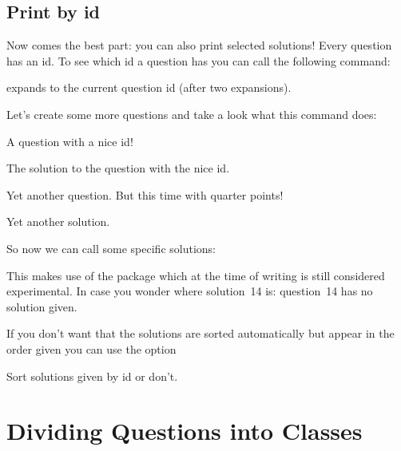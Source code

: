 \documentclass[DIV10,toc=index,toc=bib,numbers=noendperiod]{cnpkgdoc}
\begin{document}
\subsection{Print by \acs{id}}\label{ssec:ids}
Now comes the best part: you can also print selected solutions!  Every
question has an \acs{id}.  To see which \acs{id} a question has you can call
the following command:
\begin{beschreibung}
  \newline{}%
    expands to the current question \acs{id} (after two expansions).
\end{beschreibung}
Let's create some more questions and take a look what this command does:
\begin{beispiel}
 \begin{question}[ID=nice!]
  A question with a nice \acs{id}!
 \end{question}
 \begin{solution}
  The solution to the question with the nice \acs{id}.
 \end{solution}
 \begin{question}{3.75}
  Yet another question. But this time with quarter points!
 \end{question}
 \begin{solution}
  Yet another solution.
 \end{solution}
\end{beispiel}

So now we can call some specific solutions:
\begin{beispiel}
 \printsolutions[byID={first,nice!,10,14}]
\end{beispiel}
This makes use of the  package which at the time of writing is
still considered experimental.  In case you wonder where solution~14 is:
question~14 has no solution given.

If you don't want that the solutions are sorted automatically but appear in
the order given you can use the option
\begin{beschreibung}
    Sort solutions given by \acs{id} or don't.
\end{beschreibung}

\section{Dividing Questions into Classes}\label{sec:dividing-concepts}
\end{document}
